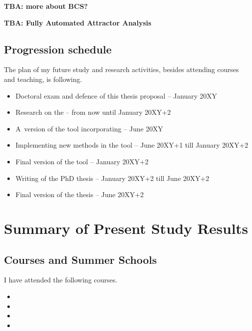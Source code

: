 \documentclass[11pt,a4paper]{report}
\newcounter{counter}[section]
\begin{document}
\textbf{TBA: more about BCS?}

\textbf{TBA: Fully Automated Attractor Analysis}

\section{Progression schedule}

The plan of my future study and research activities, besides attending
courses and teaching, is following.

\begin{itemize}
\item Doctoral exam and defence of this thesis proposal -- January 20XY
\item Research on the  -- from now until January 20XY+2
\item A~version of the tool incorporating -- June 20XY
\item Implementing new methods in the tool -- June 20XY+1 till January 20XY+2
\item Final version of the tool -- January 20XY+2
\item Writing of the PhD thesis -- January 20XY+2 till June 20XY+2
\item Final version of the thesis -- June 20XY+2
\end{itemize}


\newpage
{}





\appendix

\chapter{Summary of Present Study Results}\label{app:results}

\section{Courses and Summer Schools}
I have attended the following courses.
\begin{itemize}
\item 
\item 
\item 
\item 
\end{itemize}
\end{document}
